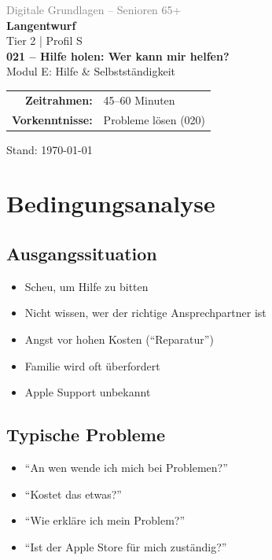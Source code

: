 \documentclass[11pt,a4paper]{article}
\begin{document}
\begin{titlepage}
    \centering
    \vspace*{2cm}
    {\Large\textcolor{gray}{Digitale Grundlagen -- Senioren 65+}}\\[2cm]
    {\Huge\textcolor{fach}{\textbf{Langentwurf}}}\\[0.5cm]
    {\large Tier 2 | Profil S}\\[2cm]
    {\LARGE\textbf{021 -- Hilfe holen: Wer kann mir helfen?}}\\[0.5cm]
    {\large Modul E: Hilfe \& Selbstständigkeit}\\[2cm]
    \begin{tabular}{rl}
        \textbf{Zeitrahmen:} & 45--60 Minuten \\
        \textbf{Vorkenntnisse:} & Probleme lösen (020) \\
    \end{tabular}
    \vfill
    {\normalsize Stand: \today}
\end{titlepage}

\tableofcontents
\newpage

\section{Bedingungsanalyse}

\subsection{Ausgangssituation}
\begin{itemize}
    \item Scheu, um Hilfe zu bitten
    \item Nicht wissen, wer der richtige Ansprechpartner ist
    \item Angst vor hohen Kosten (``Reparatur'')
    \item Familie wird oft überfordert
    \item Apple Support unbekannt
\end{itemize}

\subsection{Typische Probleme}
\begin{itemize}
    \item ``An wen wende ich mich bei Problemen?''
    \item ``Kostet das etwas?''
    \item ``Wie erkläre ich mein Problem?''
    \item ``Ist der Apple Store für mich zuständig?''
\end{itemize}
\end{document}
